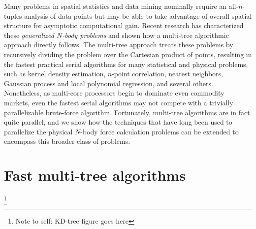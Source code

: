\documentclass[times, leqno,twocolumn]{article}
\newcommand{\authornote}[1]{\footnote{Note to self: #1}}
\begin{document}
Many problems in spatial statistics and data mining nominally require an all-$n$-tuples analysis of data points but may be able to take advantage of overall spatial structure for asymptotic computational gain.
Recent research has characterized these {\it generalized $N$-body problems} and shown how a multi-tree algorithmic approach directly follows.
The multi-tree approach treats these problems by recursively dividing the problem over the Cartesian product of points, resulting in the fastest practical serial algorithms for many statistical and physical problems, such as kernel density estimation, $n$-point correlation, nearest neighbors, Gaussian process and local polynomial regression, and several others.
Nonetheless, as multi-core processors begin to dominate even commodity markets, even the fastest serial algorithms may not compete with a trivially parallelizable brute-force algorithm.
Fortunately, multi-tree algorithms are in fact quite parallel, and we show how the techniques that have long been used to parallelize the physical $N$-body force calculation problems can be extended to encompass this broader class of problems.

\section{Fast multi-tree algorithms}

\authornote{KD-tree figure goes here}
\end{document}
